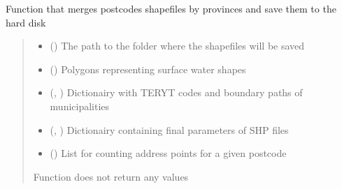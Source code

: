 \documentclass[letterpaper,10pt,english]{sphinxmanual}
\begin{document}

\begin{fulllineitems}
\label{\detokenize{pcm_utilities:pcm_utilities.save_merged_shps}}
\pysigstartsignatures
{}
\pysigstopsignatures
\sphinxAtStartPar
Function that merges postcodes shapefiles by provinces and save them to the hard disk
\begin{quote}\begin{description}
\begin{itemize}
\item {} 
\sphinxAtStartPar
{} () \textendash{} The path to the folder where the shapefiles will be saved

\item {} 
\sphinxAtStartPar
{} () \textendash{} Polygons representing surface water shapes

\item {} 
\sphinxAtStartPar
{} (\sphinxcode{\sphinxupquote{Dict}}{[}, \sphinxcode{\sphinxupquote{List}}{[}\sphinxcode{\sphinxupquote{Any}}{]}{]}) \textendash{} Dictionairy with TERYT codes and boundary paths of municipalities

\item {} 
\sphinxAtStartPar
{} (\sphinxcode{\sphinxupquote{Dict}}{[}, \sphinxcode{\sphinxupquote{Any}}{]}) \textendash{} Dictionairy containing final parameters of SHP files

\item {} 
\sphinxAtStartPar
{} (\sphinxcode{\sphinxupquote{List}}{[}\sphinxcode{\sphinxupquote{int}}{]}) \textendash{} List for counting address points for a given postcode

\end{itemize}

\sphinxAtStartPar
{}

\sphinxAtStartPar
Function does not return any values

\end{description}\end{quote}

\end{fulllineitems}
\end{document}
